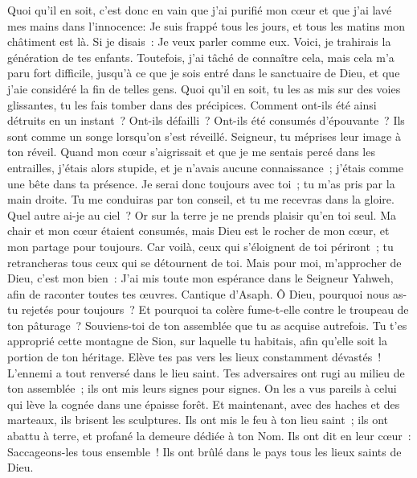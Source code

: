 \begin{multicols}{2}
Quoi qu'il en soit, c'est donc en vain que j'ai purifié mon cœur et que j'ai lavé mes mains dans l'innocence:
Je suis frappé tous les jours, et tous les matins mon châtiment est là.
Si je disais~: Je veux parler comme eux. Voici, je trahirais la génération de tes enfants.
Toutefois, j'ai tâché de connaître cela, mais cela m'a paru fort difficile,
jusqu'à ce que je sois entré dans le sanctuaire de Dieu, et que j'aie considéré la fin de telles gens.
Quoi qu'il en soit, tu les as mis sur des voies glissantes, tu les fais tomber dans des précipices.
Comment ont-ils été ainsi détruits en un instant~? Ont-ils défailli~? Ont-ils été consumés d'épouvante~?
Ils sont comme un songe lorsqu'on s'est réveillé. Seigneur, tu méprises leur image à ton réveil.
Quand mon cœur s'aigrissait et que je me sentais percé dans les entrailles,
j'étais alors stupide, et je n'avais aucune connaissance~; j'étais comme une bête dans ta présence.
Je serai donc toujours avec toi~; tu m'as pris par la main droite.
Tu me conduiras par ton conseil, et tu me recevras dans la gloire.
Quel autre ai-je au ciel~? Or sur la terre je ne prends plaisir qu'en toi seul.
Ma chair et mon cœur étaient consumés, mais Dieu est le rocher de mon cœur, et mon partage pour toujours.
Car voilà, ceux qui s'éloignent de toi périront~; tu retrancheras tous ceux qui se détournent de toi.
Mais pour moi, m'approcher de Dieu, c'est mon bien~: J'ai mis toute mon espérance dans le Seigneur Yahweh, afin de raconter toutes tes œuvres.
\VerseOne{}Cantique d'Asaph. Ô Dieu, pourquoi nous as-tu rejetés pour toujours~? Et pourquoi ta colère fume-t-elle contre le troupeau de ton pâturage~?
Souviens-toi de ton assemblée que tu as acquise autrefois. Tu t'es approprié cette montagne de Sion, sur laquelle tu habitais, afin qu'elle soit la portion de ton héritage.
Elève tes pas vers les lieux constamment dévastés~! L'ennemi a tout renversé dans le lieu saint.
Tes adversaires ont rugi au milieu de ton assemblée~; ils ont mis leurs signes pour signes.
On les a vus pareils à celui qui lève la cognée dans une épaisse forêt.
Et maintenant, avec des haches et des marteaux, ils brisent les sculptures.
Ils ont mis le feu à ton lieu saint~; ils ont abattu à terre, et profané la demeure dédiée à ton Nom.
Ils ont dit en leur cœur~: Saccageons-les tous ensemble~! Ils ont brûlé dans le pays tous les lieux saints de Dieu.

\end{multicols}
